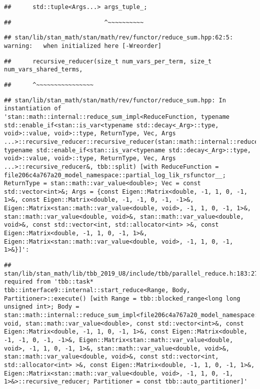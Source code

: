 \documentclass[
]{article}
\begin{document}
\begin{verbatim}
##      std::tuple<Args...> args_tuple_;
\end{verbatim}

\begin{verbatim}
##                          ^~~~~~~~~~~
\end{verbatim}

\begin{verbatim}
## stan/lib/stan_math/stan/math/rev/functor/reduce_sum.hpp:62:5: warning:   when initialized here [-Wreorder]
\end{verbatim}

\begin{verbatim}
##      recursive_reducer(size_t num_vars_per_term, size_t num_vars_shared_terms,
\end{verbatim}

\begin{verbatim}
##      ^~~~~~~~~~~~~~~~~
\end{verbatim}

\begin{verbatim}
## stan/lib/stan_math/stan/math/rev/functor/reduce_sum.hpp: In instantiation of 'stan::math::internal::reduce_sum_impl<ReduceFunction, typename std::enable_if<stan::is_var<typename std::decay<_Arg>::type, void>::value, void>::type, ReturnType, Vec, Args ...>::recursive_reducer::recursive_reducer(stan::math::internal::reduce_sum_impl<ReduceFunction, typename std::enable_if<stan::is_var<typename std::decay<_Arg>::type, void>::value, void>::type, ReturnType, Vec, Args ...>::recursive_reducer&, tbb::split) [with ReduceFunction = file206c4a767a20_model_namespace::partial_log_lik_rsfunctor__; ReturnType = stan::math::var_value<double>; Vec = const std::vector<int>&; Args = {const Eigen::Matrix<double, -1, 1, 0, -1, 1>&, const Eigen::Matrix<double, -1, -1, 0, -1, -1>&, Eigen::Matrix<stan::math::var_value<double, void>, -1, 1, 0, -1, 1>&, stan::math::var_value<double, void>&, stan::math::var_value<double, void>&, const std::vector<int, std::allocator<int> >&, const Eigen::Matrix<double, -1, 1, 0, -1, 1>&, Eigen::Matrix<stan::math::var_value<double, void>, -1, 1, 0, -1, 1>&}]':
\end{verbatim}

\begin{verbatim}
## stan/lib/stan_math/lib/tbb_2019_U8/include/tbb/parallel_reduce.h:183:27:   required from 'tbb::task* tbb::interface9::internal::start_reduce<Range, Body, Partitioner>::execute() [with Range = tbb::blocked_range<long long unsigned int>; Body = stan::math::internal::reduce_sum_impl<file206c4a767a20_model_namespace::partial_log_lik_rsfunctor__, void, stan::math::var_value<double>, const std::vector<int>&, const Eigen::Matrix<double, -1, 1, 0, -1, 1>&, const Eigen::Matrix<double, -1, -1, 0, -1, -1>&, Eigen::Matrix<stan::math::var_value<double, void>, -1, 1, 0, -1, 1>&, stan::math::var_value<double, void>&, stan::math::var_value<double, void>&, const std::vector<int, std::allocator<int> >&, const Eigen::Matrix<double, -1, 1, 0, -1, 1>&, Eigen::Matrix<stan::math::var_value<double, void>, -1, 1, 0, -1, 1>&>::recursive_reducer; Partitioner = const tbb::auto_partitioner]'
\end{verbatim}
\end{document}
